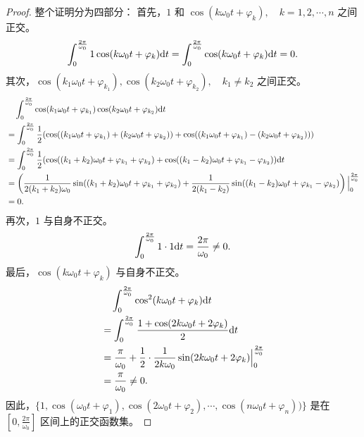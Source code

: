 \begin{proof}
    整个证明分为四部分：
    首先，$1$ 和 $\cos(k\omega_0t + \varphi_k), \quad k = 1, 2, \cdots, n$ 之间正交。
    \begin{align*}
        \int_{0}^{\frac{2\pi}{\omega_0}}1\cos(k\omega_0t + \varphi_k)\mathrm{d}t
        = \int_{0}^{\frac{2\pi}{\omega_0}}\cos(k\omega_0t + \varphi_k)\mathrm{d}t
        = 0.
    \end{align*}
    其次，$\cos(k_1\omega_0t + \varphi_{k_1}), \cos(k_2\omega_0t + \varphi_{k_2}), \quad k_1 \ne k_2$ 之间正交。
    \begin{align*}
        & \quad \int_{0}^{\frac{2\pi}{\omega_0}}\cos(k_1\omega_0t + \varphi_{k_1})\cos(k_2\omega_0t + \varphi_{k_2})\mathrm{d}t \\
        & = \int_{0}^{\frac{2\pi}{\omega_0}}\frac{1}{2}(\cos((k_1\omega_0t + \varphi_{k_1}) + (k_2\omega_0t + \varphi_{k_2})) + \cos((k_1\omega_0t + \varphi_{k_1}) - (k_2\omega_0t + \varphi_{k_2}))) \\
        & = \int_{0}^{\frac{2\pi}{\omega_0}}\frac{1}{2}(\cos((k_1 + k_2)\omega_0t + \varphi_{k_1} + \varphi_{k_2}) + \cos((k_1 - k_2)\omega_0t + \varphi_{k_1} - \varphi_{k_2}))\mathrm{d}t \\
        & = \left(\frac{1}{2(k_1 + k_2)\omega_0}\sin((k_1 + k_2)\omega_0t + \varphi_{k_1} + \varphi_{k_2})
            + \frac{1}{2(k_1 - k_2)}\sin((k_1 - k_2)\omega_0t + \varphi_{k_1} - \varphi_{k_2})\right)\Big|_{0}^{\frac{2\pi}{\omega_0}} \\
        & = 0.
    \end{align*}
    再次，$1$ 与自身不正交。
    \begin{align*}
        \int_{0}^{\frac{2\pi}{\omega_0}}1\cdot 1\mathrm{d}t
        = \frac{2\pi}{\omega_0} \ne 0.
    \end{align*}
    最后，$\cos(k\omega_0t + \varphi_k)$ 与自身不正交。
    \begin{align*}
        & \quad \int_{0}^{\frac{2\pi}{\omega_0}}\cos^2(k\omega_0t + \varphi_k)\mathrm{d}t \\
        & = \int_{0}^{\frac{2\pi}{\omega_0}}\frac{1 + \cos(2k\omega_0t + 2\varphi_k)}{2}\mathrm{d}t \\
        & = \frac{\pi}{\omega_0} + \frac{1}{2}\cdot\frac{1}{2k\omega_0}\sin(2k\omega_0t + 2\varphi_k)\Big|_{0}^{\frac{2\pi}{\omega_0}} \\
        & = \frac{\pi}{\omega_0} \ne 0.
    \end{align*}
    因此，$\{1, \cos(\omega_0t + \varphi_1), \cos(2\omega_0t + \varphi_2), \cdots, \cos(n\omega_0 t + \varphi_n))\}$
    是在 $[0, \frac{2\pi}{\omega_0}]$ 区间上的正交函数集。
\end{proof}

